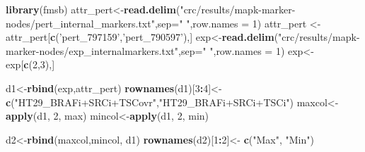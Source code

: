 \documentclass[
]{book}
\newenvironment{Shaded}{\begin{snugshade}}{\end{snugshade}}
\newcommand{\DataTypeTok}[1]{\textcolor[rgb]{0.13,0.29,0.53}{#1}}
\newcommand{\DecValTok}[1]{\textcolor[rgb]{0.00,0.00,0.81}{#1}}
\newcommand{\KeywordTok}[1]{\textcolor[rgb]{0.13,0.29,0.53}{\textbf{#1}}}
\newcommand{\NormalTok}[1]{#1}
\newcommand{\OperatorTok}[1]{\textcolor[rgb]{0.81,0.36,0.00}{\textbf{#1}}}
\newcommand{\StringTok}[1]{\textcolor[rgb]{0.31,0.60,0.02}{#1}}
\begin{document}
\begin{Shaded}
\begin{Highlighting}[]
\KeywordTok{library}\NormalTok{(fmsb)}
\NormalTok{attr_pert<-}\KeywordTok{read.delim}\NormalTok{(}\StringTok{"crc/results/mapk-marker-nodes/pert_internal_markers.txt"}\NormalTok{,}\DataTypeTok{sep=}\StringTok{" "}\NormalTok{,}\DataTypeTok{row.names =} \DecValTok{1}\NormalTok{)}
\NormalTok{attr_pert <-attr_pert[}\KeywordTok{c}\NormalTok{(}\StringTok{'pert_797159'}\NormalTok{,}\StringTok{'pert_790597'}\NormalTok{),]}
\NormalTok{exp<-}\KeywordTok{read.delim}\NormalTok{(}\StringTok{"crc/results/mapk-marker-nodes/exp_internalmarkers.txt"}\NormalTok{,}\DataTypeTok{sep=}\StringTok{" "}\NormalTok{,}\DataTypeTok{row.names =} \DecValTok{1}\NormalTok{)}
\NormalTok{exp<-exp[}\KeywordTok{c}\NormalTok{(}\DecValTok{2}\NormalTok{,}\DecValTok{3}\NormalTok{),]}

\NormalTok{d1<-}\KeywordTok{rbind}\NormalTok{(exp,attr_pert)}
\KeywordTok{rownames}\NormalTok{(d1)[}\DecValTok{3}\OperatorTok{:}\DecValTok{4}\NormalTok{]<-}\StringTok{ }\KeywordTok{c}\NormalTok{(}\StringTok{"HT29_BRAFi+SRCi+TSCovr"}\NormalTok{,}\StringTok{"HT29_BRAFi+SRCi+TSCi"}\NormalTok{)}
\NormalTok{maxcol<-}\KeywordTok{apply}\NormalTok{(d1, }\DecValTok{2}\NormalTok{, max)}
\NormalTok{mincol<-}\KeywordTok{apply}\NormalTok{(d1, }\DecValTok{2}\NormalTok{, min)}

\NormalTok{d2<-}\KeywordTok{rbind}\NormalTok{(maxcol,mincol, d1)}
\KeywordTok{rownames}\NormalTok{(d2)[}\DecValTok{1}\OperatorTok{:}\DecValTok{2}\NormalTok{]<-}\StringTok{ }\KeywordTok{c}\NormalTok{(}\StringTok{"Max"}\NormalTok{, }\StringTok{"Min"}\NormalTok{)}


\end{Highlighting}
\end{Shaded}
\end{document}
